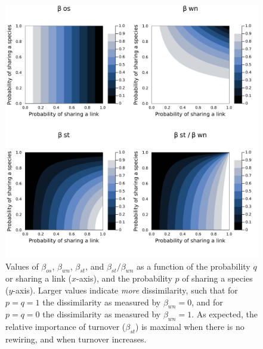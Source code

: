 \documentclass[11pt]{article}
\makeatletter
\def\maxwidth{\ifdim\Gin@nat@width>\linewidth\linewidth
\else\Gin@nat@width\fi}
\let\Oldincludegraphics\includegraphics
\renewcommand{\includegraphics}[1]{\Oldincludegraphics[width=\maxwidth]{#1}}
\providecommand{\DIFaddbeginFL}{} %
\providecommand{\DIFaddendFL}{} %
\providecommand{\DIFdelbeginFL}{} %
\providecommand{\DIFdelendFL}{} %
\newcommand{\DIFscaledelfig}{0.5}
\newlength{\DIFdelgraphicswidth} %
\newlength{\DIFdelgraphicsheight} %
\newcommand{\DIFaddincludegraphics}[2][]{{\color{blue}\fbox{\DIFOincludegraphics[#1]{#2}}}} %
\newcommand{\DIFdelincludegraphics}[2][]{%
\sbox{\DIFdelgraphicsbox}{\DIFOincludegraphics[#1]{#2}}%
\settoboxwidth{\DIFdelgraphicswidth}{\DIFdelgraphicsbox} %
\settoboxtotalheight{\DIFdelgraphicsheight}{\DIFdelgraphicsbox} %
\scalebox{\DIFscaledelfig}{%
\parbox[b]{\DIFdelgraphicswidth}{\usebox{\DIFdelgraphicsbox}\\[-\baselineskip] \rule{\DIFdelgraphicswidth}{0em}}\llap{\resizebox{\DIFdelgraphicswidth}{\DIFdelgraphicsheight}{%
\setlength{\unitlength}{\DIFdelgraphicswidth}%
\begin{picture}(1,1)%
\thicklines\linethickness{2pt} %
{\color[rgb]{1,0,0}\put(0,0){\framebox(1,1){}}}%
{\color[rgb]{1,0,0}\put(0,0){\line( 1,1){1}}}%
{\color[rgb]{1,0,0}\put(0,1){\line(1,-1){1}}}%
\end{picture}%
}\hspace*{3pt}}} %
} %
\DeclareRobustCommand{\DIFaddbeginFL}{\DIFOaddbeginFL \let\includegraphics\DIFaddincludegraphics} %
\DeclareRobustCommand{\DIFaddendFL}{\DIFOaddendFL \let\includegraphics\DIFOincludegraphics} %
\DeclareRobustCommand{\DIFdelbeginFL}{\DIFOdelbeginFL \let\includegraphics\DIFdelincludegraphics} %
\DeclareRobustCommand{\DIFdelendFL}{\DIFOaddendFL \let\includegraphics\DIFOincludegraphics} %
\makeatother
\begin{document}
\begin{figure}
\DIFdelbeginFL %
\DIFdelendFL \DIFaddbeginFL \hypertarget{fig:turnrew}{%
\centering
\includegraphics{figures/sharing_v_rewiring/components.png}
\caption{Values of \(\beta_{os}\), \(\beta_{wn}\), \(\beta_{st}\), and
\(\beta_{st}/\beta_{wn}\) as a function of the probability \(q\) or
sharing a link (\(x\)-axis), and the probability \(p\) of sharing a
species (\(y\)-axis). Larger values indicate \emph{more} dissimilarity,
such that for \(p=q=1\) the dissimilarity as measured by
\(\beta_{wn}=0\), and for \(p=q=0\) the dissimilarity as measured by
\(\beta_{wn}=1\). As expected, the relative importance of turnover
(\(\beta_{st}\)) is maximal when there is no rewiring, and when turnover
increases.}\label{fig:turnrew}
}
\DIFaddendFL 
\end{figure}
\end{document}
